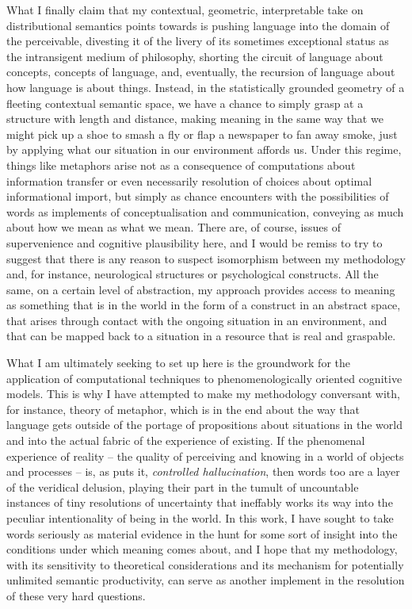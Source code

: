 What I finally claim that my contextual, geometric, interpretable take on distributional semantics points towards is pushing language into the domain of the perceivable, divesting it of the livery of its sometimes exceptional status as the intransigent medium of philosophy, shorting the circuit of language about concepts, concepts of language, and, eventually, the recursion of language about how language is about things.  Instead, in the statistically grounded geometry of a fleeting contextual semantic space, we have a chance to simply grasp at a structure with length and distance, making meaning in the same way that we might pick up a shoe to smash a fly or flap a newspaper to fan away smoke, just by applying what our situation in our environment affords us.  Under this regime, things like metaphors arise not as a consequence of computations about information transfer or even necessarily resolution of choices about optimal informational import, but simply as chance encounters with the possibilities of words as implements of conceptualisation and communication, conveying as much about how we mean as what we mean.  There are, of course, issues of supervenience and cognitive plausibility here, and I would be remiss to try to suggest that there is any reason to suspect isomorphism between my methodology and, for instance, neurological structures or psychological constructs.  All the same, on a certain level of abstraction, my approach provides access to meaning as something that is in the world in the form of a construct in an abstract space, that arises through contact with the ongoing situation in an environment, and that can be mapped back to a situation in a resource that is real and graspable.

What I am ultimately seeking to set up here is the groundwork for the application of computational techniques to phenomenologically oriented cognitive models.  This is why I have attempted to make my methodology conversant with, for instance,  theory of metaphor, which is in the end about the way that language gets outside of the portage of propositions about situations in the world and into the actual fabric of the experience of existing.  If the phenomenal experience of reality -- the quality of perceiving and knowing in a world of objects and processes -- is, as \cite{Clark2016} puts it, \emph{controlled hallucination}, then words too are a layer of the veridical delusion, playing their part in the tumult of uncountable instances of tiny resolutions of uncertainty that ineffably works its way into the peculiar intentionality of being in the world.  In this work, I have sought to take words seriously as material evidence in the hunt for some sort of insight into the conditions under which meaning comes about, and I hope that my methodology, with its sensitivity to theoretical considerations and its mechanism for potentially unlimited semantic productivity, can serve as another implement in the resolution of these very hard questions.

